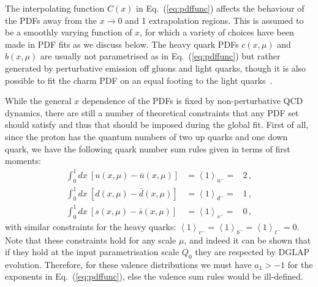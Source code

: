 The interpolating function $C(x)$ in
Eq.~(\ref{eq:pdffunc})
affects the behaviour of the PDFs away from the $x\to 0$ and 1
extrapolation regions.
%
This is assumed to be a smoothly varying function of $x$, for which a variety of choices have been made in PDF fits as we discuss below.
%
The heavy quark PDFs $c(x,\mu)$ and $b(x,\mu)$ are usually not
parametrised as in  Eq.~(\ref{eq:pdffunc}) but rather
generated by perturbative emission off gluons and light quarks,
though it is also possible to fit the charm PDF on an equal footing
to the light quarks~\cite{Ball:2016neh}.

While the general $x$ dependence of the PDFs is fixed by
non-perturbative QCD dynamics, there are still a number
of theoretical constraints that any PDF set should satisfy and thus that
should be imposed during the global fit.
%
First of all, since
the proton has the quantum numbers of two up quarks and one down quark,
we have the following quark number sum rules given in terms of first
moments: 
%
\begin{eqnarray}
\int_{0}^{1}dx\ \left[u(x,\mu)-\bar{u}(x,\mu)\right] & =\left\langle 1\right\rangle _{u^{-}}= & 2 \, ,\nonumber \\
\int_{0}^{1}dx\ \left[d(x,\mu)-\bar{d}(x,\mu)\right] & =\left\langle 1\right\rangle _{d^{-}}= & 1 \, ,\\
\int_{0}^{1}dx\ \left[s(x,\mu)-\bar{s}(x,\mu)\right] & =\left\langle 1\right\rangle _{s^{-}}= & 0 \, ,\nonumber
\end{eqnarray}
with similar constraints for the heavy quarks: $\left\langle 1\right\rangle _{c^{-}}=\left\langle 1\right\rangle _{b^{-}}=\left\langle 1\right\rangle _{t^{-}}=0$.
%
Note that these constraints hold for any scale $\mu$, and indeed it can be shown
that if they hold at the input parametrisation scale $Q_0$ they
are respected by DGLAP evolution.
%
Therefore, for these valence distributions we must have $a_1>-1$ for the exponents in
Eq.~(\ref{eq:pdffunc}), else the valence sum rules would be ill-defined.

